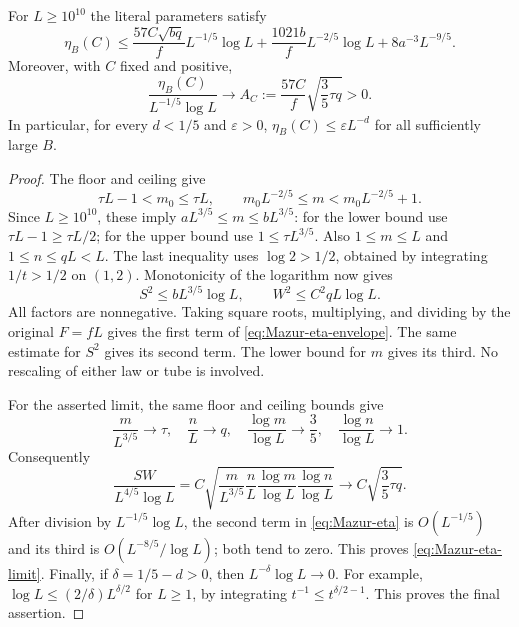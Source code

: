 \begin{proposition}
\label{prop:Mazur-eta}
For $L\ge10^{10}$ the literal parameters satisfy
\begin{equation}
 \eta_B(C)\le
 \frac{57C\sqrt{bq}}{f}L^{-1/5}\log L+
 \frac{1021b}{f}L^{-2/5}\log L+
 8a^{-3}L^{-9/5}.
 \label{eq:Mazur-eta-envelope}
\end{equation}
Moreover, with $C$ fixed and positive,
\begin{equation}
 \frac{\eta_B(C)}{L^{-1/5}\log L}
 \longrightarrow
 A_C:=\frac{57C}{f}\sqrt{\frac35\tau q}>0.
 \label{eq:Mazur-eta-limit}
\end{equation}
In particular, for every $d<1/5$ and $\varepsilon>0$,
$\eta_B(C)\le\varepsilon L^{-d}$ for all sufficiently large $B$.
\end{proposition}
\begin{proof}
The floor and ceiling give
\[
 \tau L-1<m_0\le\tau L,\qquad
 m_0L^{-2/5}\le m<m_0L^{-2/5}+1.
\]
Since $L\ge10^{10}$, these imply
$aL^{3/5}\le m\le bL^{3/5}$: for the lower bound use
$\tau L-1\ge\tau L/2$; for the upper bound use
$1\le\tau L^{3/5}$.
Also $1\le m\le L$ and $1\le n\le qL<L$.
The last inequality uses $\log2>1/2$, obtained by integrating
$1/t>1/2$ on $(1,2)$.
Monotonicity of the logarithm now gives
\[
 S^2\le bL^{3/5}\log L,\qquad
 W^2\le C^2qL\log L.
\]
All factors are nonnegative. Taking square roots, multiplying,
and dividing by the original $F=fL$ gives the first term of
\eqref{eq:Mazur-eta-envelope}. The same estimate for $S^2$
gives its second term. The lower bound for $m$ gives its third.
No rescaling of either law or tube is involved.

For the asserted limit, the same floor and ceiling bounds give
\[
 \frac m{L^{3/5}}\to\tau,\quad \frac nL\to q,\quad
 \frac{\log m}{\log L}\to\frac35,\quad
 \frac{\log n}{\log L}\to1.
\]
Consequently
\[
 \frac{SW}{L^{4/5}\log L}
 =C\sqrt{\frac m{L^{3/5}}\frac nL
              \frac{\log m}{\log L}\frac{\log n}{\log L}}
 \longrightarrow C\sqrt{\frac35\tau q}.
\]
After division by $L^{-1/5}\log L$, the second term in
\eqref{eq:Mazur-eta} is $O(L^{-1/5})$ and its third is
$O(L^{-8/5}/\log L)$; both tend to zero.
This proves \eqref{eq:Mazur-eta-limit}.
Finally, if $\delta=1/5-d>0$, then
$L^{-\delta}\log L\to0$. For example,
$\log L\le (2/\delta)L^{\delta/2}$ for $L\ge1$,
by integrating $t^{-1}\le t^{\delta/2-1}$.
This proves the final assertion.
\end{proof}

